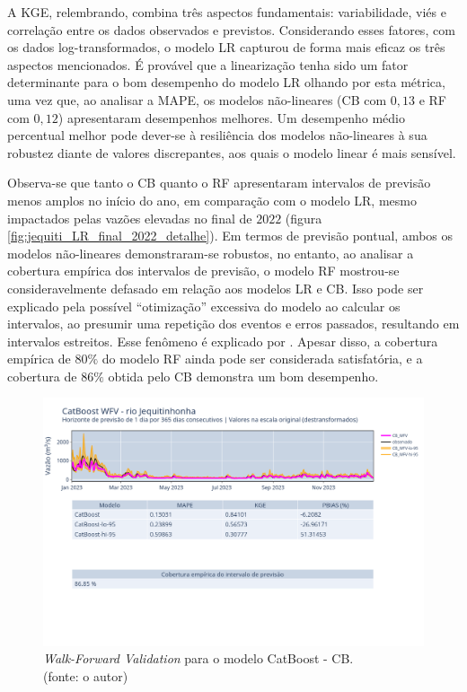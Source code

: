 A KGE, relembrando, combina três aspectos fundamentais: variabilidade, viés e correlação entre os dados observados e previstos. Considerando esses fatores, com os dados log-transformados, o modelo LR capturou de forma mais eficaz os três aspectos mencionados. É provável que a linearização tenha sido um fator determinante para o bom desempenho do modelo LR olhando por esta métrica, uma vez que, ao analisar a MAPE, os modelos não-lineares (CB com $0,13$ e RF com  $0,12$) apresentaram desempenhos melhores. Um desempenho médio percentual melhor pode dever-se à resiliência dos modelos não-lineares à sua robustez diante de valores discrepantes, aos quais o modelo linear é mais sensível.

Observa-se que tanto o CB quanto o RF apresentaram intervalos de previsão menos amplos no início do ano, em comparação com o modelo LR, mesmo impactados pelas vazões elevadas no final de $2022$ (figura \ref{fig:jequiti_LR_final_2022_detalhe}). Em termos de previsão pontual, ambos os modelos não-lineares demonstraram-se robustos, no entanto, ao analisar a cobertura empírica dos intervalos de previsão, o modelo RF mostrou-se consideravelmente defasado em relação aos modelos LR e CB. Isso pode ser explicado pela possível ``otimização'' excessiva do modelo ao calcular os intervalos, ao presumir uma repetição dos eventos e erros passados, resultando em intervalos estreitos. Esse fenômeno é explicado por \citet{RobHyndman_prediction_intervals}. Apesar disso, a cobertura empírica de $80\%$ do modelo RF ainda pode ser considerada satisfatória, e a cobertura de $86\%$ obtida pelo CB demonstra um bom desempenho.


\begin{figure}[!h]
	\centering
	\includegraphics[scale=0.33]{Figuras/jequiti/wfv/CB/CB_WFV_LOG.png}
	\caption{\textit{Walk-Forward Validation} para o modelo CatBoost - CB.\\(fonte: o autor)}
	\label{fig:jequiti_CB_WFV_LOG}
\end{figure}

